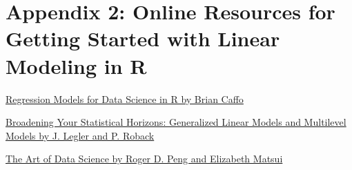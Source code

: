 \documentclass[]{book}
\theoremstyle{definition}
\theoremstyle{definition}
\theoremstyle{definition}
\theoremstyle{remark}
\begin{document}
\chapter*{Appendix 2: Online Resources for Getting Started with Linear
Modeling in
R}\label{appendix-2-online-resources-for-getting-started-with-linear-modeling-in-r}

\href{https://leanpub.com/regmods}{Regression Models for Data Science in
R by Brian Caffo}

\href{https://bookdown.org/roback/bookdown-bysh/}{Broadening Your
Statistical Horizons: Generalized Linear Models and Multilevel Models by
J. Legler and P. Roback}

\href{https://bookdown.org/rdpeng/artofdatascience/}{The Art of Data
Science by Roger D. Peng and Elizabeth Matsui}


\end{document}
